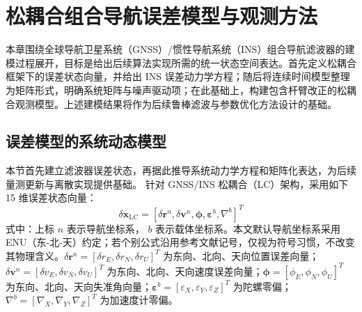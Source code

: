 
\chapter{松耦合组合导航误差模型与观测方法}

本章围绕全球导航卫星系统（GNSS）/惯性导航系统（INS）组合导航滤波器的建模过程展开，目标是给出后续算法实现所需的统一状态空间表达。首先定义松耦合框架下的误差状态向量，并给出 INS 误差动力学方程；随后将连续时间模型整理为矩阵形式，明确系统矩阵与噪声驱动项；在此基础上，构建包含杆臂改正的松耦合观测模型\cite{yan2019strapdown}。上述建模结果将作为后续鲁棒滤波与参数优化方法设计的基础。

\enlargethispage{1.5\baselineskip}

\section{误差模型的系统动态模型}

本节首先建立滤波器误差状态，再据此推导系统动力学方程和矩阵化表达，为后续量测更新与离散实现提供基础。
针对 GNSS/INS 松耦合（LC）架构，采用如下 15 维误差状态向量\cite{yan2019strapdown}：
\begin{equation}
    \delta \bm{x}_\text{LC} = [\delta \bm{r}^n, \delta \bm{v}^n, \bm{\phi}, \bm{\varepsilon}^b, \nabla^b]^T
    \label{eq:error_state}
\end{equation}
式中：上标 $n$ 表示导航坐标系， $b$ 表示载体坐标系。本文默认导航坐标系采用 ENU（东-北-天）约定；若个别公式沿用参考文献记号，仅视为符号习惯，不改变其物理含义。$\delta \bm{r}^n = [\delta r_E, \delta r_N, \delta r_U]^T$ 为东向、北向、天向位置误差向量；$\delta \bm{v}^n = [\delta v_E, \delta v_N, \delta v_U]^T$ 为东向、北向、天向速度误差向量；$\bm{\phi} = [\phi_E, \phi_N, \phi_U]^T$ 为东向、北向、天向失准角向量；$\bm{\varepsilon}^b = [\varepsilon_X, \varepsilon_Y, \varepsilon_Z]^T$ 为陀螺零偏；$\nabla^b = [\nabla_X, \nabla_Y, \nabla_Z]^T$ 为加速度计零偏。

